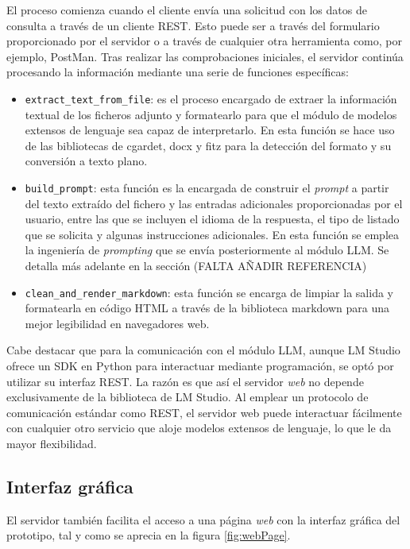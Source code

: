 El proceso comienza cuando el cliente envía una solicitud con los datos de consulta a través de un cliente REST.
Esto puede ser a través del formulario proporcionado por el servidor o a través de cualquier otra herramienta como,
por ejemplo, PostMan.
Tras realizar las comprobaciones iniciales,
el servidor continúa procesando la información mediante una serie de funciones específicas:
\begin{itemize}
\item \texttt{extract\_text\_from\_file}:
es el proceso encargado de extraer la información textual de los ficheros adjunto
y formatearlo para que el módulo de modelos extensos de lenguaje sea capaz de interpretarlo.
En esta función se hace uso de las bibliotecas de cgardet, docx y fitz para la detección del formato y
su conversión a texto plano.
\item \texttt{build\_prompt}:
esta función es la encargada de construir el \textit{prompt} a partir del texto extraído del fichero
y las entradas adicionales proporcionadas por el usuario, entre las que se incluyen el idioma de
la respuesta, el tipo de listado que se solicita y algunas instrucciones adicionales.
En esta función se emplea la ingeniería de \textit{prompting} que se envía posteriormente al módulo LLM.
Se detalla más adelante en la sección (FALTA AÑADIR REFERENCIA)
\item \texttt{clean\_and\_render\_markdown}:
esta función se encarga de limpiar la salida y formatearla en código HTML
a través de la biblioteca markdown para una mejor legibilidad en navegadores web.
\end{itemize}

Cabe destacar que para la comunicación con el módulo LLM,
aunque LM Studio ofrece un SDK en Python para interactuar mediante programación,
se optó por utilizar su interfaz REST.
La razón es que así el servidor \textit{web} no depende exclusivamente de la biblioteca de LM Studio.
Al emplear un protocolo de comunicación estándar como REST,
el servidor web puede interactuar fácilmente con cualquier otro servicio que aloje modelos extensos de lenguaje,
lo que le da mayor flexibilidad.

\subsection{Interfaz gráfica}
El servidor también facilita el acceso a una página \textit{web} con la interfaz gráfica del prototipo,
tal y como se aprecia en la figura \ref{fig:webPage}.

